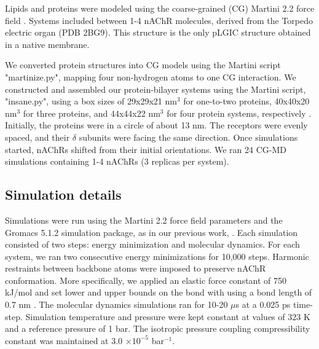 Lipids and proteins were modeled using the coarse-grained (CG) Martini 2.2 force field \citep{martini}. %
Systems included between 1-4 nAChR molecules, derived from the Torpedo electric organ \citep{Unwin2005} (PDB 2BG9).  This structure is the only pLGIC structure obtained in a native membrane. %

We converted protein structures into CG models using the Martini script "martinize.py", mapping four non-hydrogen atoms to one CG interaction. We constructed and assembled our protein-bilayer systems using  the Martini script, "insane.py", using a box sizes of 29x29x21 nm$^{3}$ for one-to-two proteins, 40x40x20 nm$^{3}$ for three proteins, and 44x44x22 nm$^{3}$ for four protein systems, respectively  \citep{Marrink2007}. Initially, the proteins were in a circle of about 13 nm. The receptors were evenly spaced, and their $\delta$ subunits were facing the same direction. Once simulations started, nAChRs shifted from their initial orientations. We ran 24 CG-MD simulations containing 1-4 nAChRs (3 replicas per system). 

\subsection{Simulation details}
Simulations were run using the Martini 2.2 force field parameters and the Gromacs 5.1.2 simulation package, \citep{Marrink2007,Pronk2013} as in our previous work, \citep{Sharp2019}. Each simulation consisted of two steps: energy minimization and molecular dynamics. {For each system, we ran two consecutive energy minimizations for 10,000 steps. }%
Harmonic restraints between backbone atoms were imposed to preserve nAChR conformation. 
More specifically, we applied an elastic force constant of 750 kJ/mol and set lower and upper bounds on the bond with using a bond length of 0.7 nm
 \citep{Marrink2007,Pronk2013}. The molecular dynamics simulations ran for 10-20 $\mu$s at a 0.025 ps time-step. Simulation temperature and pressure were kept constant at values of 323 K and a reference pressure of 1 bar. The isotropic pressure coupling compressibility constant was maintained at 3.0 $\times {10^{-5}}$ bar$^{-1}$. 

